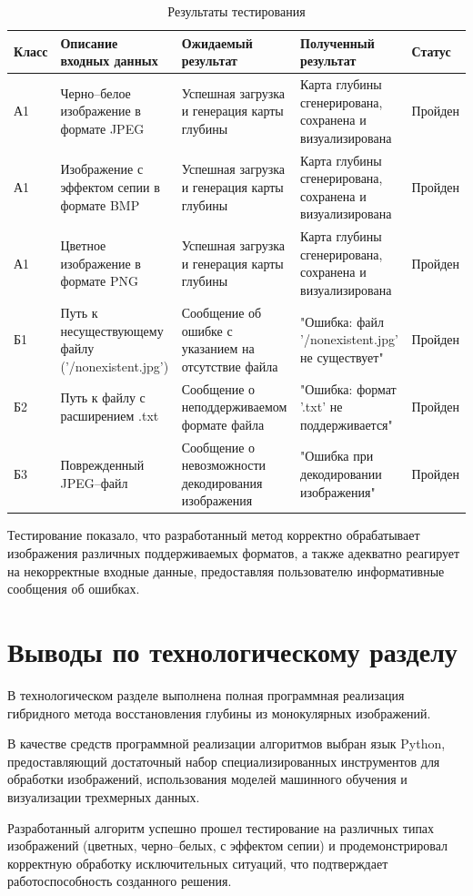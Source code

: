 \begin{table}[H]
    \centering
    \captionsetup{justification=raggedleft}
    \caption{Результаты тестирования}
    \label{tab:testing_results_pos}
    \begin{tabular}{|p{1.6cm}|p{3.7cm}|p{3.9cm}|p{3.7cm}|p{1.8cm}|}
        \hline
        \textbf{Класс} & \textbf{Описание входных \newline данных} & \textbf{Ожидаемый \newline результат} & \textbf{Полученный результат} & \textbf{Статус} \\
        \hline
        А1 & Черно--белое изображение в формате JPEG & Успешная загрузка и генерация карты глубины & Карта глубины сгенерирована, сохранена и визуализирована & Пройден \\
        \hline
        А1 & Изображение с эффектом сепии в формате BMP & Успешная загрузка и генерация карты глубины & Карта глубины сгенерирована, сохранена и визуализирована & Пройден \\
        \hline
        А1 & Цветное изображение в формате PNG & Успешная загрузка и генерация карты глубины & Карта глубины сгенерирована, сохранена и визуализирована & Пройден \\
        \hline
        Б1 & Путь к несуществующему файлу ('/nonexistent.jpg') & Сообщение об ошибке с указанием на отсутствие файла & "Ошибка: файл '/nonexistent.jpg' не существует" & Пройден \\
        \hline
        Б2 & Путь к файлу с расширением .txt & Сообщение о неподдерживаемом формате файла & "Ошибка: формат '.txt' не поддерживается" & Пройден \\
        \hline
        Б3 & Поврежденный JPEG--файл & Сообщение о невозможности декодирования изображения & "Ошибка при декодировании изображения" & Пройден \\
        \hline
    \end{tabular}
\end{table}

Тестирование показало, что разработанный метод корректно обрабатывает изображения различных поддерживаемых форматов,
а также адекватно реагирует на некорректные входные данные, предоставляя пользователю информативные сообщения об ошибках.

\section*{Выводы по технологическому разделу}
В технологическом разделе выполнена полная программная реализация гибридного метода восстановления глубины из монокулярных изображений.

В качестве средств программной реализации алгоритмов выбран язык Python, предоставляющий достаточный набор специализированных инструментов для
обработки изображений, использования моделей машинного обучения и визуализации трехмерных данных.

Разработанный алгоритм успешно прошел тестирование на различных типах изображений (цветных, черно--белых, с эффектом сепии)
и продемонстрировал корректную обработку исключительных ситуаций, что подтверждает работоспособность созданного решения.

